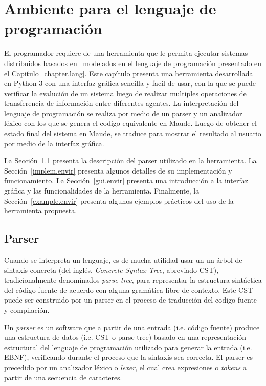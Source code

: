 
\chapter{Ambiente para el lenguaje de programaci\'on}
\label{chapter.envir}

El programador requiere de una herramienta que le permita ejecutar sistemas distribuidos basados en \SCCP \ modelados en el lenguaje de programaci\'on presentado en el Capi\'tulo~\ref{chapter.lang}. Este cap\'itulo presenta una herramienta desarrollada en Python 3 con una interfaz gr\'afica sencilla y facil de usar, con la que se puede verificar la evaluci\'on de un sistema luego de realizar multiples operaciones de transferencia de informaci\'on entre diferentes agentes. La interpretaci\'on del lenguaje de programaci\'on se realiza por medio de un parser y un analizador l\'exico con los que se genera el codigo equivalente en Maude.  Luego de obtener el estado final del sistema en Maude, se traduce para mostrar el resultado al usuario por medio de la interfaz gr\'afica.

La Secci\'on~\ref{parser.envir} presenta la descripci\'on del parser utilizado en la herramienta. La Secci\'on~\ref{implem.envir} presenta algunos detalles de su implementaci\'on y funcionamiento. La Secci\'on~\ref{gui.envir} presenta una introducci\'on a la interfaz gr\'afica y las funcionalidades de la herramienta. Finalmente, la Secci\'on~\ref{example.envir} presenta algunos ejemplos  pr\'acticos del uso de la herramienta propuesta.

\section{Parser}
\label{parser.envir}

Cuando se interpreta un lenguaje, es de mucha utilidad usar un un \'arbol de sintaxis concreta (del ingl\'es, \textit{Concrete Syntax Tree}, abreviado CST), tradicionalmente denominados \textit{parse tree}, para representar la estructura sint\'actica del c\'odigo fuente de acuerdo con alguna gram\'atica libre de contexto. Este CST puede ser construido por un parser en el proceso de traducci\'on del codigo fuente y compilaci\'on. 

Un \textit{parser} es un software que a partir de una entrada (i.e. c\'odigo fuente) produce una estructura de datos (i.e. CST o parse tree) basado en una representaci\'on estructural del lenguaje de programaci\'on utilizado para generar la entrada (i.e. EBNF), verificando durante el proceso que la sintaxis sea correcta. El parser es precedido por un analizador l\'exico o \textit{lexer}, el cual crea expresiones o \textit{tokens} a partir de una secuencia de caracteres. 

